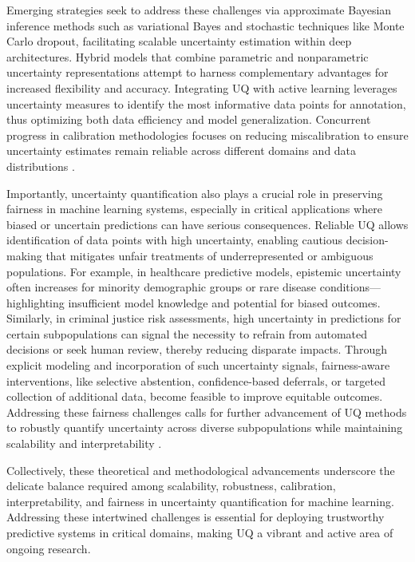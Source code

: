 \documentclass[sigconf]{acmart}
\begin{document}
Emerging strategies seek to address these challenges via approximate Bayesian inference methods such as variational Bayes and stochastic techniques like Monte Carlo dropout, facilitating scalable uncertainty estimation within deep architectures. Hybrid models that combine parametric and nonparametric uncertainty representations attempt to harness complementary advantages for increased flexibility and accuracy. Integrating UQ with active learning leverages uncertainty measures to identify the most informative data points for annotation, thus optimizing both data efficiency and model generalization. Concurrent progress in calibration methodologies focuses on reducing miscalibration to ensure uncertainty estimates remain reliable across different domains and data distributions \cite{ref28}.

Importantly, uncertainty quantification also plays a crucial role in preserving fairness in machine learning systems, especially in critical applications where biased or uncertain predictions can have serious consequences. Reliable UQ allows identification of data points with high uncertainty, enabling cautious decision-making that mitigates unfair treatments of underrepresented or ambiguous populations. For example, in healthcare predictive models, epistemic uncertainty often increases for minority demographic groups or rare disease conditions—highlighting insufficient model knowledge and potential for biased outcomes. Similarly, in criminal justice risk assessments, high uncertainty in predictions for certain subpopulations can signal the necessity to refrain from automated decisions or seek human review, thereby reducing disparate impacts. Through explicit modeling and incorporation of such uncertainty signals, fairness-aware interventions, like selective abstention, confidence-based deferrals, or targeted collection of additional data, become feasible to improve equitable outcomes. Addressing these fairness challenges calls for further advancement of UQ methods to robustly quantify uncertainty across diverse subpopulations while maintaining scalability and interpretability \cite{ref28}.

Collectively, these theoretical and methodological advancements underscore the delicate balance required among scalability, robustness, calibration, interpretability, and fairness in uncertainty quantification for machine learning. Addressing these intertwined challenges is essential for deploying trustworthy predictive systems in critical domains, making UQ a vibrant and active area of ongoing research.
\end{document}
